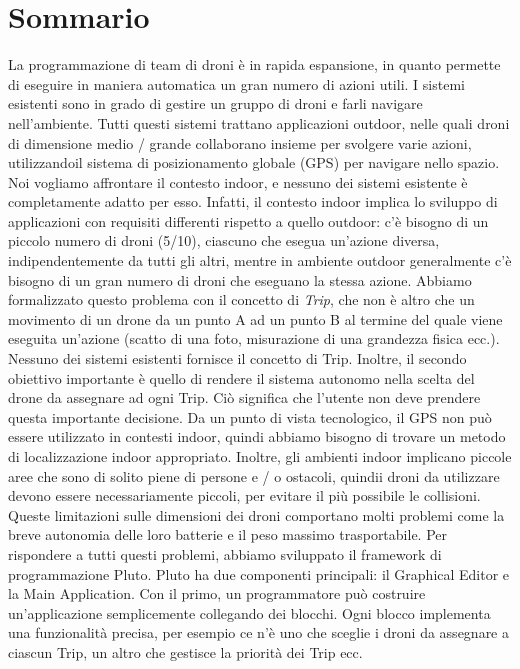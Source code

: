 \chapter*{Sommario}


La programmazione di team di droni è in rapida espansione, in quanto permette di eseguire in maniera automatica un gran numero di azioni utili.
I sistemi esistenti sono in grado di gestire un gruppo di droni e farli navigare nell'ambiente.
Tutti questi sistemi trattano applicazioni outdoor, nelle quali droni di dimensione medio / grande collaborano insieme per svolgere varie azioni, utilizzandoil sistema di posizionamento globale (GPS) per navigare nello spazio.
Noi vogliamo affrontare il contesto indoor, e nessuno dei sistemi esistente è completamente adatto per esso.
Infatti, il contesto indoor implica lo sviluppo di applicazioni con requisiti differenti rispetto a quello outdoor:
c'è bisogno di un piccolo numero di droni (5/10), ciascuno che esegua un'azione diversa, indipendentemente da tutti gli altri, mentre in ambiente outdoor generalmente c'è bisogno di un gran numero di droni che eseguano la stessa azione.
Abbiamo formalizzato questo problema con il concetto di \textit{Trip}, che non è altro che un movimento di un drone da un punto A ad un punto B al termine del quale viene eseguita un'azione (scatto di una foto, misurazione di una grandezza fisica ecc.).
Nessuno dei sistemi esistenti fornisce il concetto di Trip.
Inoltre, il secondo obiettivo importante è quello di rendere il sistema autonomo nella scelta del drone da assegnare ad ogni Trip.
Ciò significa che l'utente non deve prendere questa importante decisione.
Da un punto di vista tecnologico, il GPS non può essere utilizzato in contesti indoor, quindi abbiamo bisogno di trovare un metodo di localizzazione indoor appropriato.
Inoltre, gli ambienti indoor implicano piccole aree che sono di solito piene di persone e / o ostacoli, quindii droni da utilizzare devono essere necessariamente piccoli, per evitare il più possibile le collisioni.
Queste limitazioni sulle dimensioni dei droni comportano molti problemi come la breve autonomia delle loro batterie e il peso massimo trasportabile.
Per rispondere a tutti questi problemi, abbiamo sviluppato il framework di programmazione Pluto.
Pluto ha due componenti principali: il Graphical Editor e la Main Application.
Con il primo, un programmatore può costruire un'applicazione semplicemente collegando dei blocchi.
Ogni blocco implementa una funzionalità precisa, per esempio ce n'è uno che sceglie i droni da assegnare a ciascun Trip, un altro che gestisce la priorità dei Trip ecc.
